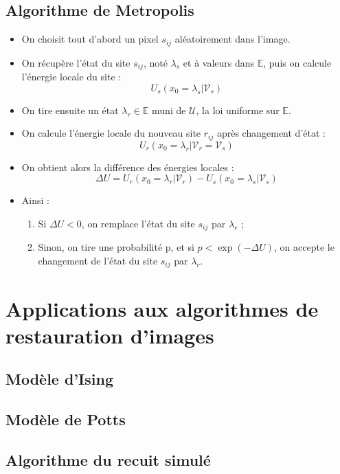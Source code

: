 \documentclass[a4paper, 12pt]{article}
\begin{document}
\subsection[Algorithme de Metropolis]{Algorithme de Metropolis}
\begin{itemize}
\item On choisit tout d'abord un pixel $s_{ij} $ aléatoirement dans l'image.
\item On récupère l'état du site $s_{ij} $, noté $\lambda_s$ et à valeurs dans $\mathbb{E}$, puis on calcule l'énergie locale du site : 
\[
  U_s(x_0=\lambda_s| \mathcal{V}_s)
\]
\item On tire ensuite un état $\lambda_r \in \mathbb{E}$ muni de $\mathcal{U}$, la loi uniforme sur $\mathbb{E}$.
\item On calcule l'énergie locale du nouveau site $r_{ij}$ après changement d'état : 
\[
  U_r(x_0=\lambda_r| \mathcal{V}_r = \mathcal{V}_s) 
\]
\item On obtient alors la différence des énergies locales : 
\[
  \Delta U = U_r(x_0=\lambda_r| \mathcal{V}_r)-U_s(x_0=\lambda_s| \mathcal{V}_s)
\]
\item Ainsi : 
\begin{enumerate}
  \item Si $\Delta U < 0$, on remplace l'état du site $s_{ij}$ par $\lambda_r$ ;
  \item Sinon, on tire une probabilité p, et si $p < \exp({-\Delta U })$, on accepte le changement de l'état du site $s_{ij}$ par $\lambda_r$.
\end{enumerate}
\end{itemize}

\section{Applications aux algorithmes de restauration d'images}
\subsection[Modèle d'Ising]{Modèle d'Ising}
\subsection[Modèle de Potts]{Modèle de Potts}
\subsection[Algorithme du recuit simulé]{Algorithme du recuit simulé}
\end{document}
